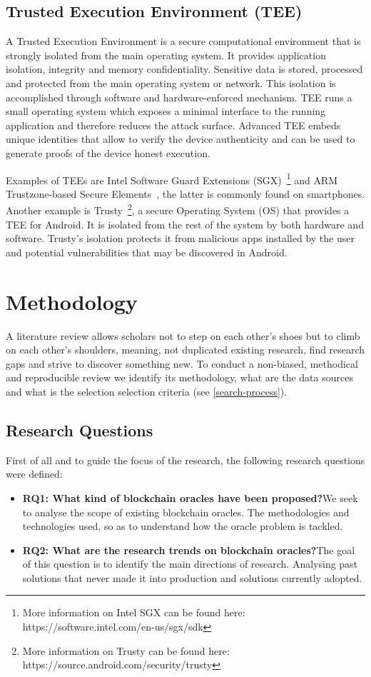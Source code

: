 \documentclass[final,3p,12pt,twocolumn]{elsarticle}
\begin{document}
\subsection{Trusted Execution Environment (TEE)}
A Trusted Execution Environment is a secure computational environment that is strongly isolated from the main operating system. It provides application isolation, integrity and memory confidentiality. Sensitive data is stored, processed and protected from the main operating system or network. This isolation is accomplished through software and hardware-enforced mechanism. TEE runs a small operating system which exposes a minimal interface to the running application and therefore reduces the attack surface. Advanced TEE embeds unique identities that allow to verify the device authenticity and can be used to generate proofs of the device honest execution.

Examples of TEEs are Intel Software Guard Extensions (SGX)~\footnote{More information on Intel SGX can be found here: https://software.intel.com/en-us/sgx/sdk} and ARM Trustzone-based Secure Elements~\citet{Bunz2018}, the latter is commonly found on smartphones. Another example is Trusty~\footnote{More information on Trusty can be found here: https://source.android.com/security/trusty}, a secure Operating System (OS) that provides a TEE for Android. It is isolated from the rest of the system by both hardware and software. Trusty's isolation protects it from malicious apps installed by the user and potential vulnerabilities that may be discovered in Android.


\section{Methodology}\label{sec:3}
A literature review allows scholars not to step on each other's shoes but to climb on each other's shoulders, meaning, not duplicated existing research, find research gaps and strive to discover something new. To conduct a non-biased, methodical and reproducible review we identify its methodology, what are the data sources and what is the selection selection criteria (see \ref{search-process}).

\subsection{Research Questions}
First of all and to guide the focus of the research, the following research questions were defined:
\begin{itemize}
  \item \textbf{RQ1:\label{RQ1} What kind of blockchain oracles have been proposed?}\newline We seek to analyse the scope of existing blockchain oracles. The methodologies and technologies used, so as to understand how the oracle problem is tackled.
  \item \textbf{RQ2:\label{RQ2} What are the research trends on blockchain oracles?}\newline The goal of this question is to identify the main directions of research. Analysing past solutions that never made it into production and solutions currently adopted.
\end{itemize}
\end{document}

